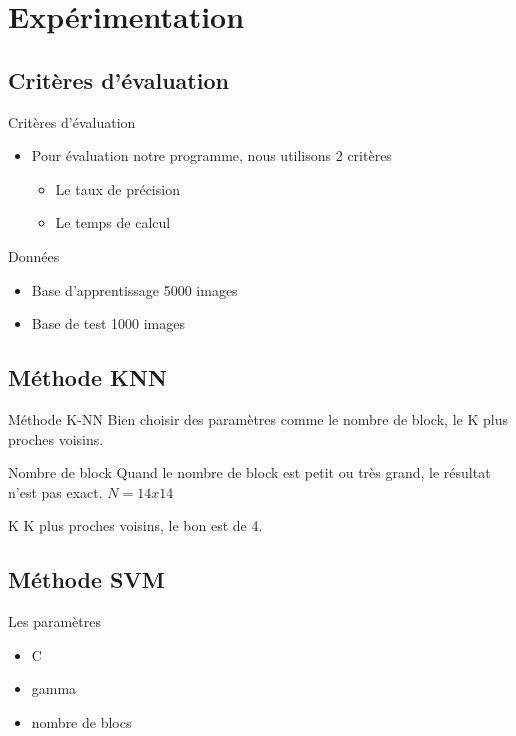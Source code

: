 \documentclass[12pt]{beamer}
\begin{document}
\section{Expérimentation}
\subsection{Critères d'évaluation}
\begin{frame}{Critères d'évaluation}
  \begin{itemize}
  \item Pour évaluation notre programme, nous utilisons 2 critères
  \begin{itemize}
   \item Le taux de précision
   \item Le temps de calcul 
  \end{itemize}
  \end{itemize}
\end{frame}
\begin{frame}{Données}
  \begin{itemize}
	\item Base d'apprentissage 5000 images
	\item Base de test 1000 images
  \end{itemize}
\end{frame}

\subsection{Méthode KNN}
\begin{frame}{Méthode K-NN}
Bien choisir des paramètres comme le nombre de block, le K plus proches voisins.
\begin{block}{Nombre de block}
Quand le nombre de block est petit ou très grand, le résultat n'est pas exact. $N = 14x14$
\end{block}
\begin{block}{K}
K plus proches voisins, le bon est de 4.
\end{block}
\end{frame}

\subsection{Méthode SVM}
\begin{frame}{Les paramètres}
  \begin{itemize}
   \item C
   \item gamma
   \item nombre de blocs
  \end{itemize}
\end{frame}
\end{document}
